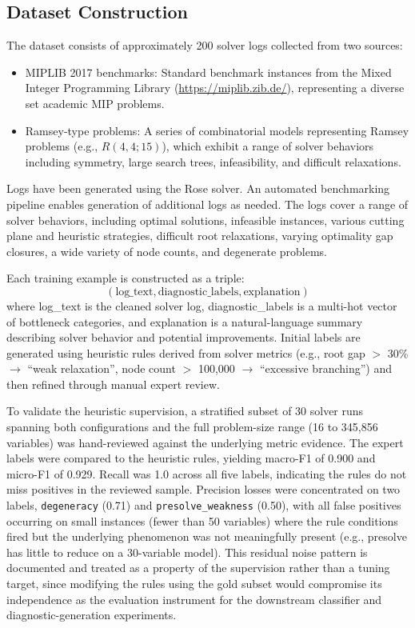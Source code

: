 \documentclass[11pt]{article}
\begin{document}
\subsection{Dataset Construction}
\label{sec:dataset}

The dataset consists of approximately 200 solver logs collected from two sources:
\begin{itemize}
    \item MIPLIB 2017 benchmarks: Standard benchmark instances from the Mixed Integer Programming Library (\url{https://miplib.zib.de/}), 
    representing a diverse set academic MIP problems.
    \item Ramsey-type problems: A series of combinatorial models representing Ramsey problems (e.g., $R(4,4;15)$), which exhibit a 
    range of solver behaviors including symmetry, large search trees, infeasibility, and difficult relaxations.
\end{itemize}

Logs have been generated using the Rose solver. An automated benchmarking pipeline enables generation of additional logs as needed. The logs cover a 
range of solver behaviors, including optimal solutions, infeasible instances, various cutting plane and heuristic strategies, difficult root relaxations, varying 
optimality gap closures, a wide variety of node counts, and degenerate problems.

Each training example is constructed as a triple:
\begin{equation}
    (\text{log\_text}, \text{diagnostic\_labels}, \text{explanation})
\end{equation}
where log\_text is the cleaned solver log, 
diagnostic\_labels is a multi-hot vector of bottleneck categories, and 
explanation is a natural-language summary describing solver behavior and potential improvements. 
Initial labels are generated using heuristic rules derived from solver metrics (e.g., root gap $>$ 30\% $\rightarrow$ ``weak relaxation'', node count $>$ 100{,}000 $\rightarrow$ ``excessive branching'')
and then refined through manual expert review.

To validate the heuristic supervision, a stratified subset of 30 solver runs spanning both configurations and the full problem-size range (16 to 345{,}856 variables) was hand-reviewed against the underlying metric evidence.
The expert labels were compared to the heuristic rules, yielding macro-F1 of 0.900 and micro-F1 of 0.929.
Recall was 1.0 across all five labels, indicating the rules do not miss positives in the reviewed sample.
Precision losses were concentrated on two labels, \texttt{degeneracy} (0.71) and \texttt{presolve\_weakness} (0.50), with all false positives occurring on small instances (fewer than 50 variables) where the rule conditions fired but the underlying phenomenon was not meaningfully present (e.g., presolve has little to reduce on a 30-variable model).
This residual noise pattern is documented and treated as a property of the supervision rather than a tuning target, since modifying the rules using the gold subset would compromise its independence as the evaluation instrument for the downstream classifier and diagnostic-generation experiments.
\end{document}
